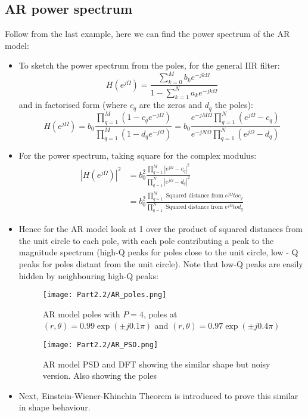 \documentclass[12pt]{article}
\begin{document}
    \subsection{AR power spectrum}
    Follow from the last example, here we can find the power spectrum of the AR model:
    \begin{itemize}
        \item To sketch the power spectrum from the poles, for the general IIR filter:
        \[
        H(e^{j\Omega}) = \frac{\sum_{k=0}^M b_k e^{-jk\Omega}}{1- \sum_{k=1}^N a_k e^{-jk\Omega}}
        \]
        and in factorised form (where $c_q$ are the zeros and $d_q$ the poles):
        \[
        H(e^{j\Omega}) = b_0 \frac{\prod_{q=1}^M(1-c_q e^{-j\Omega})}{\prod_{q=1}^M(1-d_q e^{-j\Omega})} =  b_0 \frac{e^{-jM\Omega}\prod_{q=1}^N (e^{j\Omega} -c_q)}{e^{-jN\Omega}\prod_{q=1}^N (e^{j\Omega} -d_q)}
        \]
        \item For the power spectrum, taking square for the complex modulus:
        \begin{align*}
            |H(e^{j\Omega})|^2 &= b_0^2 \frac{\prod_{q=1}^M |e^{j\Omega} -c_q|^2}{\prod_{q=1}^N |e^{j\Omega} -d_q|^2} \\
            &= b_0^2 \frac{\prod_{q=1}^M \textrm{ Squared distance from } e^{j\Omega} to c_q}{\prod_{q=1}^N \textrm{ Squared distance from } e^{j\Omega} to d_q}
        \end{align*}
        \item Hence for the AR model look at 1 over the product of squared distances from the unit circle to each pole, with each pole contributing a peak to the magnitude spectrum (high-Q peaks for poles close to the unit circle, low - Q peaks for poles distant from the unit circle). Note that low-Q peaks are easily hidden by neighbouring high-Q peaks:
        \begin{figure}[H]
            \centering
            \texttt{[image: Part2.2/AR\_poles.png]}
            \caption{AR model poles with $P=4$, poles at $(r,\theta) =0.99\exp(\pm j0.1\pi)$ and $(r,\theta) =0.97\exp(\pm j0.4\pi)$}
        \end{figure}
        \begin{figure}[H]
            \centering
            \texttt{[image: Part2.2/AR\_PSD.png]}
            \caption{AR model PSD and DFT showing the similar shape but noisy version. Also showing the poles}
        \end{figure}
        \item Next, Einstein-Wiener-Khinchin Theorem is introduced to prove this similar in shape behaviour.
    \end{itemize}
\end{document}
